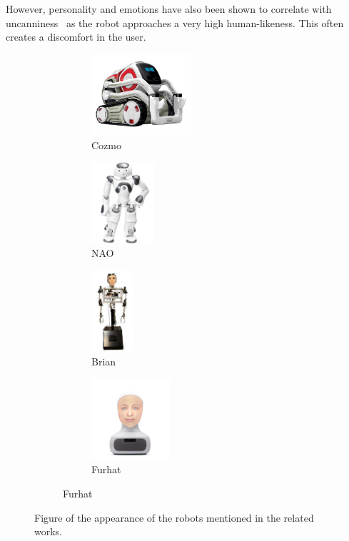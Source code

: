 \documentclass[nomenclature, english, biblatex]{kththesis}
\begin{document}
However, personality and emotions have also been shown to correlate with uncanniness~\cite{makarainen2014exaggerating, walters2008avoiding, paetzel2021influence} as the robot approaches a very high human-likeness. This often creates a discomfort in the user. 
\begin{figure}[ht]
    \centering
    \begin{subfigure}{\textwidth}
        \begin{subfigure}{0.24\textwidth}
            \centering
            \includegraphics[height=3cm]{figures/cozmo.png}
            \caption{Cozmo}
        \end{subfigure}
        \begin{subfigure}{0.24\textwidth}
            \centering
            \includegraphics[height=3cm]{figures/nao.png}
            \caption{NAO}
        \end{subfigure}
        \begin{subfigure}{0.24\textwidth}
            \centering
            \includegraphics[height=3cm]{figures/brian.png}
            \caption{Brian}
        \end{subfigure}
        \begin{subfigure}{0.24\textwidth}
            \centering
            \includegraphics[height=3cm]{figures/furhat.png}
            \caption{Furhat}
        \end{subfigure}
    \end{subfigure}
    \caption{Figure of the appearance of the robots mentioned in the related works.}
    \label{fig:robots}
\end{figure}
\end{document}
